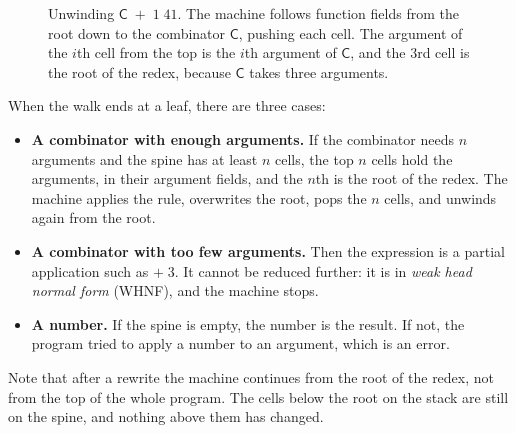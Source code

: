 \documentclass[11pt,a4paper]{article}
\newcommand{\cmb}[1]{\textsf{#1}}
\newcommand{\C}{\cmb{C}}
\newcommand{\gcell}[5][half]{%
  \node[#1, anchor=east] (#2-f) at (#3) {#4};
  \node[#1, anchor=west] (#2-a) at (#3) {#5};}
\theoremstyle{definition}
\theoremstyle{plain}
\begin{document}
\begin{figure}[t]
\centering
{}
\caption{Unwinding $\C\;{+}\;1\;41$. The machine follows function fields from
the root down to the combinator $\C$, pushing each cell. The argument of the
$i$th cell from the top is the $i$th argument of $\C$, and the 3rd cell is
the root of the redex, because $\C$ takes three arguments.}
\label{fig:spine}
\end{figure}

When the walk ends at a leaf, there are three cases:

\begin{itemize}[itemsep=2pt]
\item \textbf{A combinator with enough arguments.} If the combinator needs
  $n$ arguments and the spine has at least $n$ cells, the top $n$ cells hold
  the arguments, in their argument fields, and the $n$th is the root of the
  redex. The machine applies the rule, overwrites the root, pops the $n$
  cells, and unwinds again from the root.
\item \textbf{A combinator with too few arguments.} Then the expression is a
  partial application such as ${+}\;3$. It cannot be reduced further: it is
  in \emph{weak head normal form} (WHNF), and the machine stops.
\item \textbf{A number.} If the spine is empty, the number is the result. If
  not, the program tried to apply a number to an argument, which is an error.
\end{itemize}

\noindent
Note that after a rewrite the machine continues from the root of the redex,
not from the top of the whole program. The cells below the root on the stack
are still on the spine, and nothing above them has changed.
\end{document}
